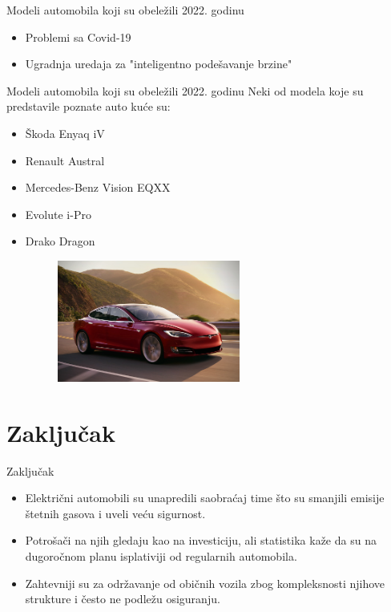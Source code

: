 \documentclass[11pt]{beamer}
\begin{document}
\begin{frame}{Modeli automobila koji su obeležili 2022. godinu}{\thesection \, \secname}

\begin{itemize}
\item Problemi sa Covid-19 
\item Ugradnja uredaja za "inteligentno podešavanje brzine"
\end{itemize}
\end{frame}

\begin{frame}{Modeli automobila koji su obeležili 2022. godinu}
Neki od modela koje su predstavile poznate auto kuće su:
\begin{itemize}
\item Škoda Enyaq iV
\item Renault Austral
\item Mercedes-Benz Vision EQXX
\item Evolute i-Pro
\item Drako Dragon

\begin{figure}[h]
        \centering
        \includegraphics[width=60mm, scale=0.5]{tesla.jpeg}
        \label{fig:tesla.jpeg}
        \end{figure}

\end{itemize}

\end{frame}

\section{Zaključak}

\begin{frame}{Zaključak}
\begin{itemize}
\item Električni automobili su unapredili saobraćaj time što su smanjili emisije štetnih gasova i uveli veću sigurnost.
\item Potrošači na njih gledaju kao na investiciju, ali statistika kaže da su na dugoročnom planu isplativiji od regularnih automobila.
\item Zahtevniji su za održavanje od običnih vozila zbog kompleksnosti njihove strukture i često ne podležu osiguranju.
\end{itemize}

\end{frame}
\end{document}

